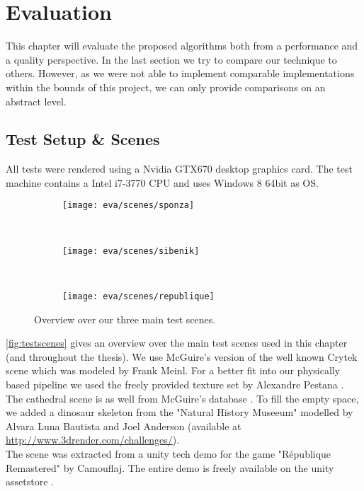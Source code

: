 \documentclass[thesis.tex]{subfiles}
\begin{document}
\chapter{Evaluation}\label{chap:eva}
This chapter will evaluate the proposed algorithms both from a performance and a quality perspective.
In the last section we try to compare our technique to others.
However, as we were not able to implement comparable implementations within the bounds of this project, we can only provide comparisons on an abstract level.

\section{Test Setup \& Scenes} \label{sec:eva:setup}
All tests were rendered using a Nvidia GTX670 desktop graphics card.
The test machine contains a Intel i7-3770 CPU and uses Windows 8 64bit as OS.

\begin{figure}
\centering
\begin{subfigure}[b]{0.8\textwidth}
\centering
\texttt{[image: eva/scenes/sponza]}
\caption{}
\end{subfigure}
\\
\begin{subfigure}[b]{0.8\textwidth}
\centering
\texttt{[image: eva/scenes/sibenik]}
\caption{}
\end{subfigure}
\\
\begin{subfigure}[b]{0.8\textwidth}
\centering
\texttt{[image: eva/scenes/republique]}
\caption{}
\end{subfigure}
\caption{Overview over our three main test scenes.}
\label{fig:testscenes}
\end{figure}
\autoref{fig:testscenes} gives an overview over the main test scenes used in this chapter (and throughout the thesis).
We use McGuire's \cite{bib:McGuire2011Data} version of the well known Crytek  scene which was modeled by Frank Meinl.
For a better fit into our physically based pipeline we used the freely provided texture set  by Alexandre Pestana \cite{bib:sponzapbr}.
\\
The  cathedral scene is as well from McGuire's database \cite{bib:McGuire2011Data}.
To fill the empty space, we added a dinosaur skeleton from the "Natural History Museeum" modelled by Alvara Luna Bautista and Joel Anderson (available at \url{http://www.3drender.com/challenges/}).
\\
The  scene was extracted from a unity tech demo for the game "République Remastered" by Camouflaj.
The entire demo is freely available on the unity assetstore \cite{bib:republique}.
\end{document}
